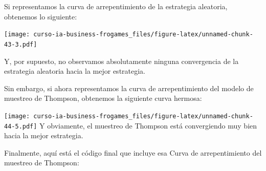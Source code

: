 \documentclass[
]{book}
\begin{document}
Si representamos la curva de arrepentimiento de la estrategia aleatoria, obtenemos lo siguiente:

\texttt{[image: curso-ia-business-frogames\_files/figure-latex/unnamed-chunk-43-3.pdf]}

Y, por supuesto, no observamos absolutamente ninguna convergencia de la estrategia aleatoria hacia la mejor estrategia.

Sin embargo, si ahora representamos la curva de arrepentimiento del modelo de muestreo de Thompson, obtenemos la siguiente curva hermosa:

\texttt{[image: curso-ia-business-frogames\_files/figure-latex/unnamed-chunk-44-5.pdf]}
Y obviamente, el muestreo de Thompson está convergiendo muy bien hacia la mejor estrategia.

Finalmente, aquí está el código final que incluye esa Curva de arrepentimiento del muestreo de Thompson:
\end{document}
